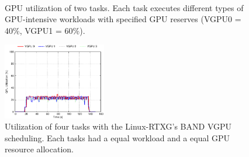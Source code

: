 \begin{figure}[!t]
\begin{minipage}[t]{0.33\hsize}
\begin{center}
\label{fig:band_rtx}
\label{fig:rtx_nouveau}
\end{center}
\end{minipage}
\begin{minipage}[t]{0.33\hsize}
\begin{center}
\label{fig:fifo_gdev} \\
\label{fig:band_gdev}
\label{fig:gdev_usage}
\end{center}
\end{minipage}
\caption{GPU utilization of two tasks. Each task executes different
types of GPU-intensive workloads with specified GPU reserves (VGPU0 =
 40\%, VGPU1 = 60\%).}
\label{fig:utilize}
\end{figure}

\begin{figure}[!t]
\begin{center}
\includegraphics[width=0.4\textwidth]{img/band_rtx_fair}
\caption{Utilization of four tasks with the Linux-RTXG's BAND VGPU scheduling. Each tasks had a equal workload and a equal GPU resource allocation.}
\label{fig:band_rtx_fair}
\end{center}
\end{figure}

